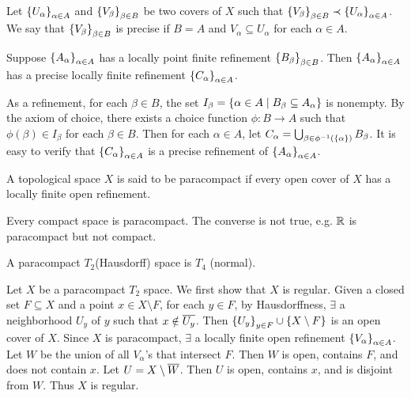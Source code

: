 \begin{df}
    Let $\set{U_\alpha}_{\alpha\in A}$ and $\set{V_\beta}_{\beta\in B}$ be two covers of $X$ such that $\set{V_\beta}_{\beta\in B} \prec \set{U_\alpha}_{\alpha\in A}$. We say that $\set{V_\beta}_{\beta\in B}$ is precise if $B = A$ and $V_\alpha \subseteq U_\alpha$ for each $\alpha\in A$.
\end{df}

\begin{prop}
    Suppose $\set{A_\alpha}_{\alpha\in A}$ has a locally point finite refinement $\set{B_\beta}_{\beta\in B}$. Then $\set{A_\alpha}_{\alpha\in A}$ has a precise locally finite refinement $\set{C_\alpha}_{\alpha\in A}$.
    \begin{pf}
        As a refinement, for each $\beta \in B$, the set $I_\beta = \set{\alpha\in A \mid B_\beta \subseteq A_\alpha}$ is nonempty. By the axiom of choice, there exists a choice function $\phi: B\to A$ such that $\phi(\beta) \in I_\beta$ for each $\beta\in B$. Then for each $\alpha\in A$, let $C_\alpha = \bigcup_{\beta\in \phi^{-1}(\set{\alpha})} B_\beta$. It is easy to verify that $\set{C_\alpha}_{\alpha\in A}$ is a precise refinement of $\set{A_\alpha}_{\alpha\in A}$.
    \end{pf}
\end{prop}

\begin{df}
    A topological space $X$ is said to be paracompact if every open cover of $X$ has a locally finite open refinement.
\end{df}

\begin{rmk}
    Every compact space is paracompact. The converse is not true, e.g. $\R$ is paracompact but not compact.
\end{rmk}

\begin{thm}
    A paracompact $T_2$(Hausdorff) space is $T_4$ (normal).
    \begin{pf}
        Let $X$ be a paracompact $T_2$ space. We first show that $X$ is regular. Given a closed set $F\subseteq X$ and a point $x\in X\setminus F$, for each $y\in F$, by Hausdorffness, $\exists$ a neighborhood $U_y$ of $y$ such that $x \notin \Bar{U_y}$. Then $\set{U_y}_{y\in F} \cup \set{X\setminus F}$ is an open cover of $X$. Since $X$ is paracompact, $\exists$ a locally finite open refinement $\set{V_\alpha}_{\alpha\in A}$. Let $W$ be the union of all $V_\alpha$'s that intersect $F$. Then $W$ is open, contains $F$, and does not contain $x$. Let $U = X\setminus \Bar{W}$. Then $U$ is open, contains $x$, and is disjoint from $W$. Thus $X$ is regular.
    \end{pf}
\end{thm}

